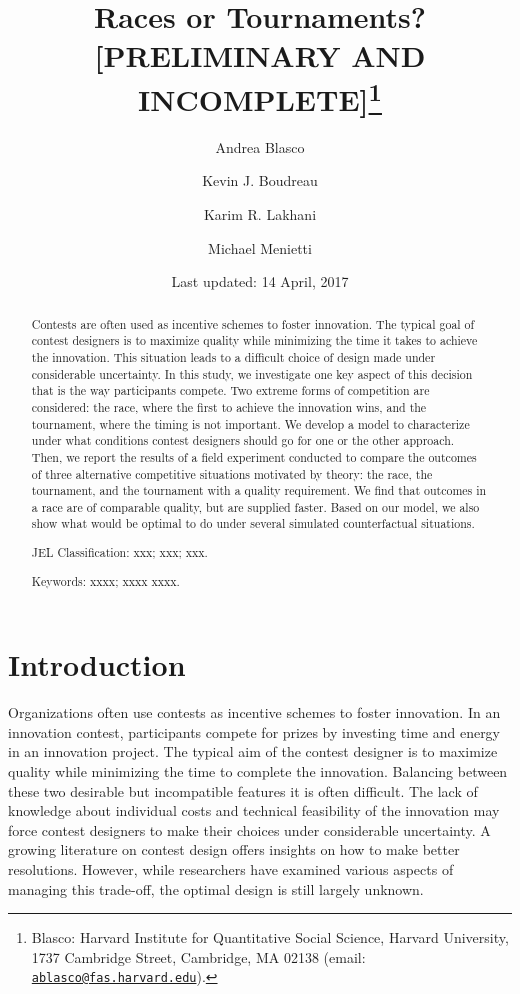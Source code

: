 \documentclass[12pt,]{article}
\title{Races or Tournaments? {[}PRELIMINARY AND INCOMPLETE{]}\thanks{Blasco: Harvard Institute for Quantitative Social Science, Harvard
University, 1737 Cambridge Street, Cambridge, MA 02138 (email:
\href{mailto:ablasco@fas.harvard.edu}{\nolinkurl{ablasco@fas.harvard.edu}}).}}
\author{Andrea Blasco \and Kevin J. Boudreau \and Karim R. Lakhani \and Michael Menietti}
\date{Last updated: 14 April, 2017}
\theoremstyle{plain} %
\begin{document}
\maketitle
\begin{abstract}
Contests are often used as incentive schemes to foster innovation. The
typical goal of contest designers is to maximize quality while
minimizing the time it takes to achieve the innovation. This situation
leads to a difficult choice of design made under considerable
uncertainty. In this study, we investigate one key aspect of this
decision that is the way participants compete. Two extreme forms of
competition are considered: the race, where the first to achieve the
innovation wins, and the tournament, where the timing is not important.
We develop a model to characterize under what conditions contest
designers should go for one or the other approach. Then, we report the
results of a field experiment conducted to compare the outcomes of three
alternative competitive situations motivated by theory: the race, the
tournament, and the tournament with a quality requirement. We find that
outcomes in a race are of comparable quality, but are supplied faster.
Based on our model, we also show what would be optimal to do under
several simulated counterfactual situations.

\smallskip\noindent 
JEL Classification: xxx; xxx; xxx.

\smallskip\noindent 
Keywords: xxxx; xxxx xxxx.
\end{abstract}


\clearpage
\tableofcontents
\setcounter{tocdepth}{2}
\clearpage

\section{Introduction}\label{introduction}

Organizations often use contests as incentive schemes to foster
innovation. In an innovation contest, participants compete for prizes by
investing time and energy in an innovation project. The typical aim of
the contest designer is to maximize quality while minimizing the time to
complete the innovation. Balancing between these two desirable but
incompatible features it is often difficult. The lack of knowledge about
individual costs and technical feasibility of the innovation may force
contest designers to make their choices under considerable uncertainty.
A growing literature on contest design offers insights on how to make
better resolutions. However, while researchers have examined various
aspects of managing this trade-off, the optimal design is still largely
unknown.
\end{document}
